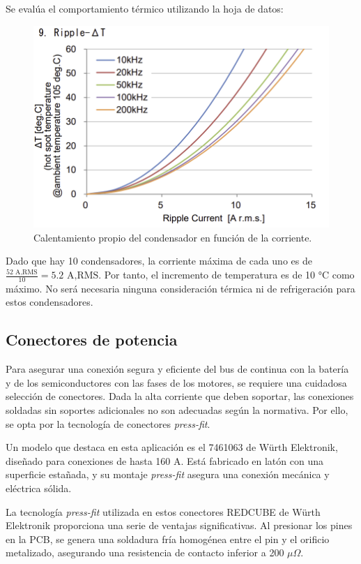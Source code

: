 Se evalúa el comportamiento térmico utilizando la hoja de datos:
\begin{figure}[H]
	\centering
	\includegraphics[width=0.7\linewidth]{fig/dc-link-temp}
	\caption{Calentamiento propio del condensador en función de la corriente.}
\end{figure}

Dado que hay 10 condensadores, la corriente máxima de cada uno es de $\frac{52 \text{ A,RMS}}{10} = 5.2 \text{ A,RMS}$. Por tanto, el incremento de temperatura es de 10 °C como máximo. No será necesaria ninguna consideración térmica ni de refrigeración para estos condensadores.

\subsection{Conectores de potencia}

Para asegurar una conexión segura y eficiente del bus de continua con la batería y de los semiconductores con las fases de los motores, se requiere una cuidadosa selección de conectores. Dada la alta corriente que deben soportar, las conexiones soldadas sin soportes adicionales no son adecuadas según la normativa. Por ello, se opta por la tecnología de conectores \textit{press-fit}.

Un modelo que destaca en esta aplicación es el 7461063 de Würth Elektronik, diseñado para conexiones de hasta 160 A. Está fabricado en latón con una superficie estañada, y su montaje \textit{press-fit} asegura una conexión mecánica y eléctrica sólida.

La tecnología \textit{press-fit} utilizada en estos conectores REDCUBE de Würth Elektronik proporciona una serie de ventajas significativas. Al presionar los pines en la PCB, se genera una soldadura fría homogénea entre el pin y el orificio metalizado, asegurando una resistencia de contacto inferior a 200 $\mu\Omega$.

